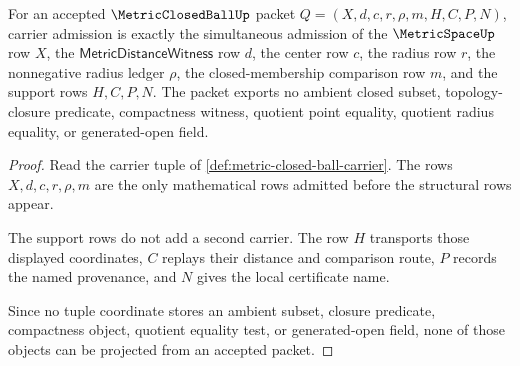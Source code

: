 \begin{theorem}
\label{thm:metricclosedball-carrier-obligations}
For an accepted $\MetricClosedBallUp$ packet $Q=(X,d,c,r,\rho,m,H,C,P,N)$, carrier admission is exactly the simultaneous admission of the $\MetricSpaceUp$ row $X$, the $\mathsf{MetricDistanceWitness}$ row $d$, the center row $c$, the radius row $r$, the nonnegative radius ledger $\rho$, the closed-membership comparison row $m$, and the support rows $H,C,P,N$. The packet exports no ambient closed subset, topology-closure predicate, compactness witness, quotient point equality, quotient radius equality, or generated-open field.
\end{theorem}
\begin{proof}
Read the carrier tuple of \autoref{def:metric-closed-ball-carrier}. The rows $X,d,c,r,\rho,m$ are the only mathematical rows admitted before the structural rows appear.

The support rows do not add a second carrier. The row $H$ transports those displayed coordinates, $C$ replays their distance and comparison route, $P$ records the named provenance, and $N$ gives the local certificate name.

Since no tuple coordinate stores an ambient subset, closure predicate, compactness object, quotient equality test, or generated-open field, none of those objects can be projected from an accepted packet.
\end{proof}

